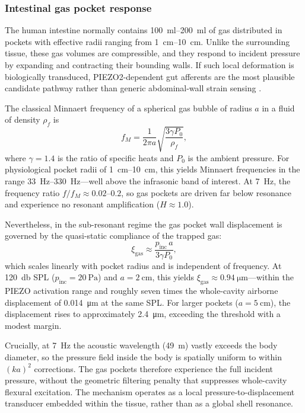 \subsubsection{Intestinal gas pocket response}

The human intestine normally contains \SIrange{100}{200}{\milli\litre} of
gas distributed in pockets with effective radii ranging from
\SIrange{1}{10}{\centi\metre}.  Unlike the surrounding tissue, these gas
volumes are compressible, and they respond to incident pressure by
expanding and contracting their bounding walls.  If such local deformation is
biologically transduced, PIEZO2-dependent gut afferents are the most plausible
candidate pathway rather than generic abdominal-wall strain sensing
\cite{ServinVences2023}.

The classical Minnaert frequency of a spherical gas bubble of radius $a$ in
a fluid of density $\rho_f$ is \cite{lamb1882}
\begin{equation}
  f_M = \frac{1}{2\pi a} \sqrt{\frac{3\gamma P_0}{\rho_f}},
\end{equation}
where $\gamma = 1.4$ is the ratio of specific heats and $P_0$ is the
ambient pressure.  For physiological pocket radii of
\SIrange{1}{10}{\centi\metre}, this yields Minnaert frequencies in the range
\SIrange{33}{330}{\hertz}---well above the infrasonic band of interest.  At
\SI{7}{\hertz}, the frequency ratio $f / f_M \approx 0.02$--$0.2$, so gas
pockets are driven far below resonance and experience no resonant
amplification ($H \approx 1.0$).

Nevertheless, in the sub-resonant regime the gas pocket wall displacement
is governed by the quasi-static compliance of the trapped gas:
\begin{equation}
  \xi_{\mathrm{gas}} \approx \frac{p_{\mathrm{inc}} \, a}{3 \gamma P_0},
\end{equation}
which scales linearly with pocket radius and is independent of frequency.
At \SI{120}{\decibel} SPL ($p_{\mathrm{inc}} = \SI{20}{\pascal}$) and
$a = \SI{2}{\centi\metre}$, this yields
$\xi_{\mathrm{gas}} \approx \SI{0.94}{\micro\metre}$---within the PIEZO
activation range and roughly seven times the whole-cavity airborne
displacement of \SI{0.014}{\micro\metre} at the same SPL.  For larger pockets
($a = \SI{5}{\centi\metre}$), the displacement rises to approximately
\SI{2.4}{\micro\metre}, exceeding the threshold with a modest margin.

Crucially, at \SI{7}{\hertz} the acoustic wavelength (\SI{49}{\metre})
vastly exceeds the body diameter, so the pressure field inside the body is
spatially uniform to within $(ka)^2$ corrections.  The gas pockets therefore
experience the full incident pressure, without the geometric filtering
penalty that suppresses whole-cavity flexural excitation.  The mechanism
operates as a local pressure-to-displacement transducer embedded within
the tissue, rather than as a global shell resonance.

